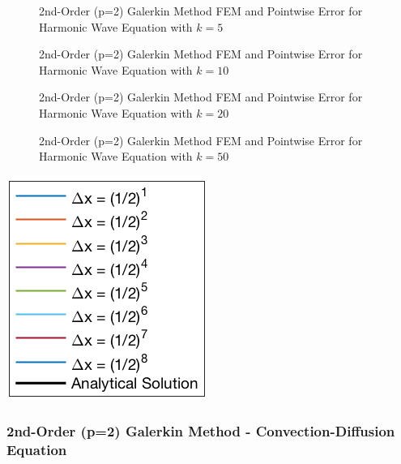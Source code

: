 \documentclass[10pt]{article}		%
\numberwithin{equation}{section}
\begin{document}
\begin{figure}[H]
	\begin{center}
		\caption{2nd-Order (p=2) Galerkin Method FEM and Pointwise Error for Harmonic Wave Equation with $k = 5$}
	\end{center}
\end{figure}

\newpage

\begin{figure}[H]
	\begin{center}
		\caption{2nd-Order (p=2) Galerkin Method FEM and Pointwise Error for Harmonic Wave Equation with $k = 10$}
	\end{center}
\end{figure}

\begin{figure}[H]
	\begin{center}
		\caption{2nd-Order (p=2) Galerkin Method FEM and Pointwise Error for Harmonic Wave Equation with $k = 20$}
	\end{center}
\end{figure}

\begin{figure}[H]
	\begin{center}
		\caption{2nd-Order (p=2) Galerkin Method FEM and Pointwise Error for Harmonic Wave Equation with $k = 50$}
	\end{center}
\end{figure}

\begin{center}
	\includegraphics[height = 0.10\linewidth]{legend}
\end{center}

\newpage

\subsubsection{2nd-Order (p=2) Galerkin Method - Convection-Diffusion Equation}
\end{document}
